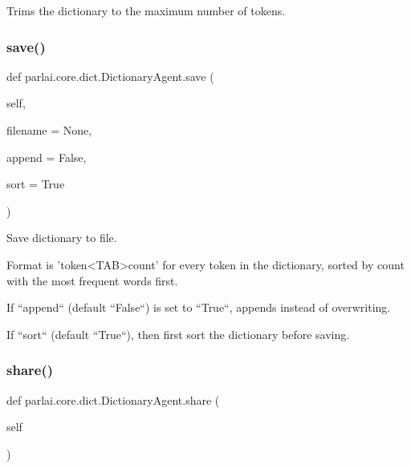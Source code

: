 \begin{DoxyVerb}Trims the dictionary to the maximum number of tokens.
\end{DoxyVerb}
 \mbox{\label{classparlai_1_1core_1_1dict_1_1DictionaryAgent_a0c6a8d8b67fe978549b328e7b7b07450}} 
\subsubsection{\texorpdfstring{save()}{save()}}
{\footnotesize\ttfamily def parlai.\+core.\+dict.\+Dictionary\+Agent.\+save (\begin{DoxyParamCaption}\item[{}]{self,  }\item[{}]{filename = {\ttfamily None},  }\item[{}]{append = {\ttfamily False},  }\item[{}]{sort = {\ttfamily True} }\end{DoxyParamCaption})}

\begin{DoxyVerb}Save dictionary to file.

Format is 'token<TAB>count' for every token in the dictionary, sorted
by count with the most frequent words first.

If ``append`` (default ``False``) is set to ``True``, appends instead of
overwriting.

If ``sort`` (default ``True``), then first sort the dictionary before saving.
\end{DoxyVerb}
 \mbox{\label{classparlai_1_1core_1_1dict_1_1DictionaryAgent_a3d8996e367685451f7de85e8284243d7}} 
\subsubsection{\texorpdfstring{share()}{share()}}
{\footnotesize\ttfamily def parlai.\+core.\+dict.\+Dictionary\+Agent.\+share (\begin{DoxyParamCaption}\item[{}]{self }\end{DoxyParamCaption})}

